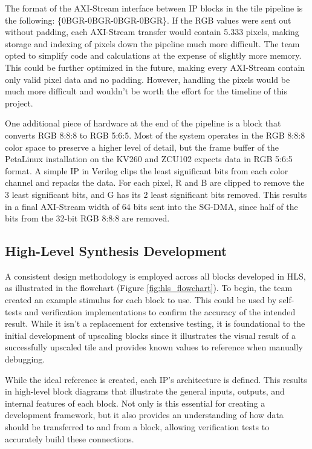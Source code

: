 \documentclass{article}
\begin{document}
        \par The format of the AXI-Stream interface between IP blocks in the tile pipeline is the following: \{0BGR-0BGR-0BGR-0BGR\}. If the RGB values were sent out without padding, each AXI-Stream transfer would contain 5.333 pixels, making storage and indexing of pixels down the pipeline much more difficult. The team opted to simplify code and calculations at the expense of slightly more memory. This could be further optimized in the future, making every AXI-Stream contain only valid pixel data and no padding. However, handling the pixels would be much more difficult and wouldn’t be worth the effort for the timeline of this project. 
        \par One additional piece of hardware at the end of the pipeline is a block that converts RGB 8:8:8 to RGB 5:6:5. Most of the system operates in the RGB 8:8:8 color space to preserve a higher level of detail, but the frame buffer of the PetaLinux installation on the KV260 and ZCU102 expects data in RGB 5:6:5 format. A simple IP in Verilog clips the least significant bits from each color channel and repacks the data. For each pixel, R and B are clipped to remove the 3 least significant bits, and G has its 2 least significant bits removed. This results in a final AXI-Stream width of 64 bits sent into the SG-DMA, since half of the bits from the 32-bit RGB 8:8:8 are removed.

        
    \subsection{High-Level Synthesis Development}
        \noindent A consistent design methodology is employed across all blocks developed in HLS, as illustrated in the flowchart (Figure \ref{fig:hls_flowchart}). To begin, the team created an example stimulus for each block to use. This could be used by self-tests and verification implementations to confirm the accuracy of the intended result. While it isn’t a replacement for extensive testing, it is foundational to the initial development of upscaling blocks since it illustrates the visual result of a successfully upscaled tile and provides known values to reference when manually debugging. 
        \par While the ideal reference is created, each IP’s architecture is defined. This results in high-level block diagrams that illustrate the general inputs, outputs, and internal features of each block. Not only is this essential for creating a development framework, but it also provides an understanding of how data should be transferred to and from a block, allowing verification tests to accurately build these connections. 
\end{document}
